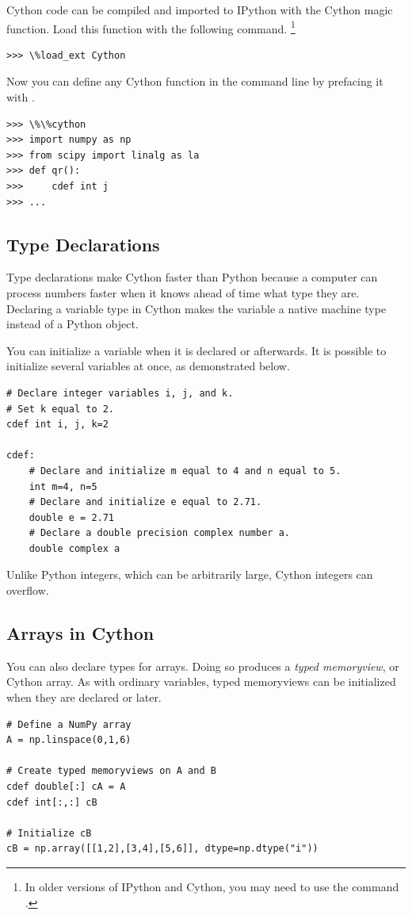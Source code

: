 Cython code can be compiled and imported to IPython with the Cython magic function.
Load this function with the following command.
\footnote{In older versions of IPython and Cython, you may need to use the command .}
\begin{lstlisting}
>>> \%load_ext Cython
\end{lstlisting}
Now you can define any Cython function in the command line by prefacing it with .
\begin{lstlisting}
>>> \%\%cython
>>> import numpy as np
>>> from scipy import linalg as la
>>> def qr():
>>>     cdef int j
>>> ...
\end{lstlisting}

\subsection*{Type Declarations}
Type declarations make Cython faster than Python because a computer can process numbers faster when it knows ahead of time what type they are.
Declaring a variable type in Cython makes the variable a native machine type instead of a Python object.

You can initialize a variable when it is declared or afterwards.
It is possible to initialize several variables at once, as demonstrated below.

\begin{lstlisting}
# Declare integer variables i, j, and k.
# Set k equal to 2.
cdef int i, j, k=2

cdef:
    # Declare and initialize m equal to 4 and n equal to 5.
    int m=4, n=5
    # Declare and initialize e equal to 2.71.
    double e = 2.71
    # Declare a double precision complex number a.
    double complex a
\end{lstlisting}

\begin{warn}
Unlike Python integers, which can be arbitrarily large, Cython integers can overflow.
\end{warn} 

\subsection*{Arrays in Cython}
You can also declare types for arrays.
Doing so produces a \emph{typed memoryview}, or Cython array.
As with ordinary variables, typed memoryviews can be initialized when they are declared or later.
\begin{lstlisting}
# Define a NumPy array
A = np.linspace(0,1,6)

# Create typed memoryviews on A and B
cdef double[:] cA = A
cdef int[:,:] cB

# Initialize cB
cB = np.array([[1,2],[3,4],[5,6]], dtype=np.dtype("i"))
\end{lstlisting}

